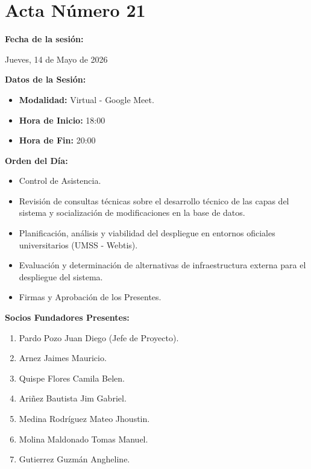 \newpage
\section{Acta Número 21}
\label{sec:acta21}

\noindent \textbf{Fecha de la sesión:}\par
Jueves, 14 de Mayo de 2026

\vspace*{0.5cm}
\noindent \textbf{Datos de la Sesión:}
\vspace{-0.2cm}
\begin{itemize}[noitemsep]
\item \textbf{Modalidad:} Virtual - Google Meet.
\item \textbf{Hora de Inicio:} 18:00
\item \textbf{Hora de Fin:} 20:00
\end{itemize}

\vspace*{0.5cm}
\noindent \textbf{Orden del Día:}
\vspace{-0.2cm}
\begin{itemize}[noitemsep]
\item Control de Asistencia.
\item Revisión de consultas técnicas sobre el desarrollo técnico de las capas del sistema y socialización de modificaciones en la base de datos.
\item Planificación, análisis y viabilidad del despliegue en entornos oficiales universitarios (UMSS - Webtis).
\item Evaluación y determinación de alternativas de infraestructura externa para el despliegue del sistema.
\item Firmas y Aprobación de los Presentes.
\nobreak\end{itemize}

\vspace*{0.5cm}
\noindent \textbf{Socios Fundadores Presentes:}
\vspace{-0.2cm}
\begin{enumerate}[noitemsep]
\item Pardo Pozo Juan Diego (Jefe de Proyecto).
\item Arnez Jaimes Mauricio.
\item Quispe Flores Camila Belen.
\item Ariñez Bautista Jim Gabriel.
\item Medina Rodríguez Mateo Jhoustin.
\item Molina Maldonado Tomas Manuel.
\item Gutierrez Guzmán Angheline.
\end{enumerate}

